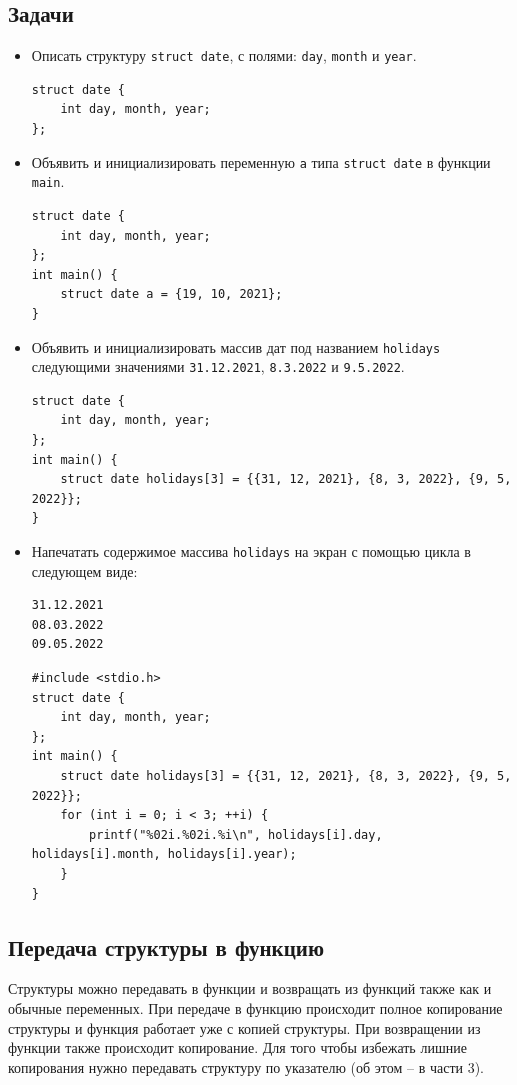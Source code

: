 \documentclass{article}
\begin{document}
\subsection*{Задачи}
\begin{itemize}
\item Описать структуру \texttt{struct date}, с полями: \texttt{day}, \texttt{month} и \texttt{year}. 
\begin{lstlisting}[backgroundcolor = \color{solcolor}]
struct date {
    int day, month, year;
};
\end{lstlisting}
\item Объявить и инициализировать переменную \texttt{a} типа \texttt{struct date} в функции \texttt{main}.
\begin{lstlisting}[backgroundcolor = \color{solcolor}]
struct date {
    int day, month, year;
};
int main() {
    struct date a = {19, 10, 2021};
}
\end{lstlisting}
\item Объявить и инициализировать массив дат под названием \texttt{holidays} следующими значениями \texttt{31.12.2021}, \texttt{8.3.2022} и \texttt{9.5.2022}.
\begin{lstlisting}[backgroundcolor = \color{solcolor}]
struct date {
    int day, month, year;
};
int main() {
    struct date holidays[3] = {{31, 12, 2021}, {8, 3, 2022}, {9, 5, 2022}};
}
\end{lstlisting}
\item Напечатать содержимое массива \texttt{holidays} на экран с помощью цикла в следующем виде:
\begin{verbatim}
31.12.2021
08.03.2022
09.05.2022
\end{verbatim}

\begin{lstlisting}[backgroundcolor = \color{solcolor}]
#include <stdio.h>
struct date {
    int day, month, year;
};
int main() {
    struct date holidays[3] = {{31, 12, 2021}, {8, 3, 2022}, {9, 5, 2022}};
    for (int i = 0; i < 3; ++i) {
        printf("%02i.%02i.%i\n", holidays[i].day, holidays[i].month, holidays[i].year);
    }
}
\end{lstlisting}

\end{itemize}

\subsection*{Передача структуры в функцию}
Структуры можно передавать в функции и возвращать из функций также как и обычные переменных. При передаче в функцию происходит полное копирование структуры и функция работает уже с копией структуры. При возвращении из функции также происходит копирование. Для того чтобы избежать лишние копирования нужно передавать структуру по указателю (об этом -- в части 3).
\end{document}
